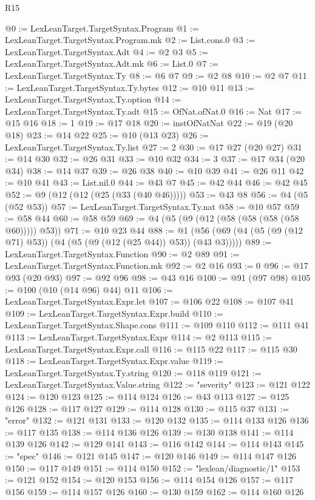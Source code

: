 \begin{lexlean}{R15}
\begin{coremodule}
@0 := LexLeanTarget.TargetSyntax.Program
@1 := LexLeanTarget.TargetSyntax.Program.mk
@2 := List.cons.{0}
@3 := LexLeanTarget.TargetSyntax.Adt
@4 := @2 @3
@5 := LexLeanTarget.TargetSyntax.Adt.mk
@6 := List.{0}
@7 := LexLeanTarget.TargetSyntax.Ty
@8 := @6 @7
@9 := @2 @8
@10 := @2 @7
@11 := LexLeanTarget.TargetSyntax.Ty.bytes
@12 := @10 @11
@13 := LexLeanTarget.TargetSyntax.Ty.option
@14 := LexLeanTarget.TargetSyntax.Ty.adt
@15 := OfNat.ofNat.{0}
@16 := Nat
@17 := @15 @16
@18 := 1
@19 := @17 @18
@20 := instOfNatNat
@22 := @19 (@20 @18)
@23 := @14 @22
@25 := @10 (@13 @23)
@26 := LexLeanTarget.TargetSyntax.Ty.list
@27 := 2
@30 := @17 @27 (@20 @27)
@31 := @14 @30
@32 := @26 @31
@33 := @10 @32
@34 := 3
@37 := @17 @34 (@20 @34)
@38 := @14 @37
@39 := @26 @38
@40 := @10 @39
@41 := @26 @11
@42 := @10 @41
@43 := List.nil.{0}
@44 := @43 @7
@45 := @42 @44
@46 := @42 @45
@52 := @9 (@12 (@12 (@25 (@33 (@40 @46)))))
@53 := @43 @8
@56 := @4 (@5 (@52 @53))
@57 := LexLeanTarget.TargetSyntax.Ty.nat
@58 := @10 @57
@59 := @58 @44
@60 := @58 @59
@69 := @4 (@5 (@9 (@12 (@58 (@58 (@58 (@58 @60))))) @53))
@71 := @10 @23 @44
@88 := @1 (@56 (@69 (@4 (@5 (@9 (@12 @71) @53)) (@4 (@5 (@9 (@12 (@25 @44)) @53)) (@43 @3)))))
@89 := LexLeanTarget.TargetSyntax.Function
@90 := @2 @89
@91 := LexLeanTarget.TargetSyntax.Function.mk
@92 := @2 @16
@93 := 0
@96 := @17 @93 (@20 @93)
@97 := @92 @96
@98 := @43 @16
@100 := @91 (@97 @98)
@105 := @100 (@10 (@14 @96) @44) @11
@106 := LexLeanTarget.TargetSyntax.Expr.let
@107 := @106 @22
@108 := @107 @41
@109 := LexLeanTarget.TargetSyntax.Expr.build
@110 := LexLeanTarget.TargetSyntax.Shape.cons
@111 := @109 @110
@112 := @111 @41
@113 := LexLeanTarget.TargetSyntax.Expr
@114 := @2 @113
@115 := LexLeanTarget.TargetSyntax.Expr.call
@116 := @115 @22
@117 := @115 @30
@118 := LexLeanTarget.TargetSyntax.Expr.value
@119 := LexLeanTarget.TargetSyntax.Ty.string
@120 := @118 @119
@121 := LexLeanTarget.TargetSyntax.Value.string
@122 := "severity"
@123 := @121 @122
@124 := @120 @123
@125 := @114 @124
@126 := @43 @113
@127 := @125 @126
@128 := @117 @127
@129 := @114 @128
@130 := @115 @37
@131 := "error"
@132 := @121 @131
@133 := @120 @132
@135 := @114 @133 @126
@136 := @117 @135
@138 := @114 @136 @126
@139 := @130 @138
@141 := @114 @139 @126
@142 := @129 @141
@143 := @116 @142
@144 := @114 @143
@145 := "spec"
@146 := @121 @145
@147 := @120 @146
@149 := @114 @147 @126
@150 := @117 @149
@151 := @114 @150
@152 := "lexlean/diagnostic/1"
@153 := @121 @152
@154 := @120 @153
@156 := @114 @154 @126
@157 := @117 @156
@159 := @114 @157 @126
@160 := @130 @159
@162 := @114 @160 @126

\end{coremodule}
\end{lexlean}
